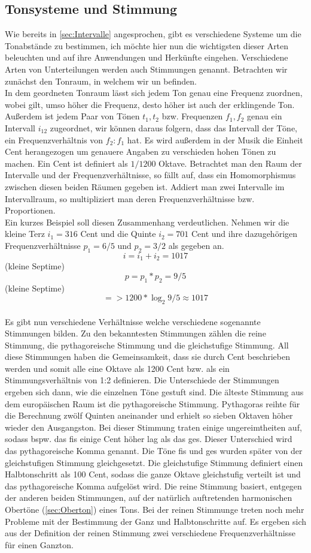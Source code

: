 \subsection{Tonsysteme und Stimmung}
\label{sec:Tonsysteme}
Wie bereits in \ref{sec:Intervalle} angesprochen, gibt es verschiedene Systeme um die Tonabstände zu bestimmen, ich möchte hier nun die wichtigsten dieser Arten beleuchten und auf ihre Anwendungen und Herkünfte eingehen.
Verschiedene Arten von Unterteilungen werden auch Stimmungen genannt. Betrachten wir zunächst den Tonraum, in welchem wir un befinden. \\
In dem geordneten Tonraum lässt sich jedem Ton genau eine Frequenz zuordnen, wobei gilt, umso höher die Frequenz, desto höher ist auch der erklingende Ton. Außerdem ist jedem Paar von Tönen $t_1, t_2$ bzw. Frequenzen $f_1, f_2$ genau ein Intervall $i_{12}$ zugeordnet, 
wir können daraus folgern, dass das Intervall der Töne, ein Frequenzverhältnis von $f_2 : f_1$ hat. Es wird außerdem in der Musik die Einheit Cent herangezogen um genauere Angaben zu verschieden hohen Tönen zu machen. Ein Cent ist definiert als 
$1/1200$ Oktave. Betrachtet man den Raum der Intervalle und der Frequenzverhältnisse, so fällt auf, dass ein Homomorphismus zwischen diesen beiden Räumen gegeben ist. Addiert man zwei Intervalle im Intervallraum, so multipliziert man deren Frequenzverhältnisse bzw. Proportionen. \\
Ein kurzes Beispiel soll diesen Zusammenhang verdeutlichen. Nehmen wir die kleine Terz $i_1 =  316$ Cent und die Quinte $i_2 =  701$ Cent und ihre dazugehörigen Frequenzverhältnisse $p_1 = 6/5$ und $p_2 = 3/2$ als gegeben an.
$$    i = i_1 + i_2 = 1017  $$ (kleine Septime)
$$    p = p_1 * p_2 = 9/5   $$ (kleine Septime)
$$   => 1200 * \log_2{9/5} \approx 1017     $$
\\
Es gibt nun verschiedene Verhältnisse welche verschiedene sogenannte Stimmungen bilden. Zu den bekanntesten Stimmungen zählen die reine Stimmung, die pythagoreische Stimmung und die gleichstufige Stimmung.
All diese Stimmungen haben die Gemeinsamkeit, dass sie durch Cent beschrieben werden und somit alle eine Oktave als 1200 Cent bzw. als ein Stimmungsverhältnis von 1:2 definieren. Die Unterschiede der Stimmungen ergeben sich dann, wie die einzelnen
Töne gestuft sind. Die älteste Stimmung aus dem europäischen Raum ist die pythagoreische Stimmung. Pythagoras reihte für die Berechnung zwölf Quinten aneinander und erhielt so sieben Oktaven höher wieder den Ausgangston. Bei dieser Stimmung traten einige 
ungereimtheiten auf, sodass bspw. das fis einige Cent höher lag als das ges. Dieser Unterschied wird das pythagoreische Komma genannt. Die Töne fis und ges wurden später von der gleichstufigen Stimmung gleichgesetzt. Die gleichstufige Stimmung definiert einen Halbtonschritt als 100 Cent, sodass die ganze Oktave gleichstufig verteilt ist und das
pythagoreische Komma aufgelöst wird. Die reine Stimmung basiert, entgegen der anderen beiden Stimmungen, auf der natürlich auftretenden harmonischen Obertöne (\ref{sec:Oberton}) eines Tons. Bei der reinen Stimmunge treten noch mehr Probleme mit der Bestimmung der Ganz und Halbtonschritte auf. Es ergeben sich aus der 
Definition der reinen Stimmung zwei verschiedene Frequenzverhältnisse für einen Ganzton. \cite{abcmusik}

